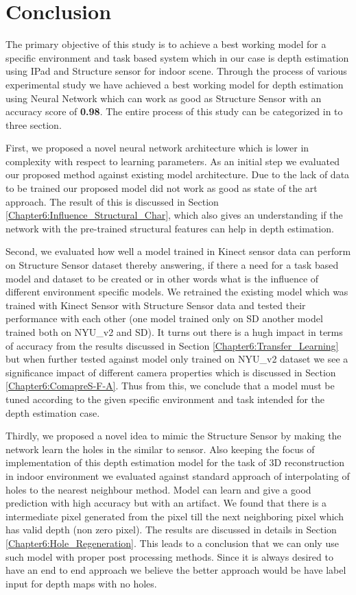 

\chapter{Conclusion}
\label{Chaptee7:Concluion}
The primary objective of this study is to achieve a best working model for a specific environment and task based system which in our case is depth estimation using IPad and Structure sensor for indoor scene. Through the process of various experimental study we have achieved a best working model for depth estimation using Neural Network which can work as good as Structure Sensor with an accuracy score of \textbf{0.98}. The entire process of this study can be categorized in to three section.

First, we proposed a novel neural network architecture which is lower in complexity with respect to learning parameters. As an initial step we evaluated our proposed method against existing model architecture. Due to the lack of data to be trained our proposed model did not work as good as state of the art approach. The result of this is discussed in Section \ref{Chapter6:Influence_Structural_Char}, which also gives an understanding if the network with the pre-trained structural features can help in depth estimation. 

Second, we evaluated how well a model trained in Kinect sensor data can perform on Structure Sensor dataset thereby answering, if there a need for a task based model and dataset to be created or in other words what is the influence of different environment specific models. We retrained the existing model which was trained with Kinect Sensor with Structure Sensor data and tested their performance with each other (one model trained only on SD another model trained both on NYU\_v2 and SD). It turns out there is a hugh impact in terms of accuracy from the results discussed in Section \ref{Chapter6:Transfer_Learning} but when further tested against model only trained on NYU\_v2 dataset we see a significance impact of different camera properties which is discussed in Section \ref{Chapter6:ComapreS-F-A}. Thus from this, we conclude that a model must be tuned according to the given specific environment and task intended for the depth estimation case.

Thirdly, we proposed a novel idea to mimic the Structure Sensor by making the network learn the holes in the similar to sensor. Also keeping the focus of implementation of this depth estimation model for the task of 3D reconstruction in indoor environment we evaluated against standard approach of interpolating of holes to the nearest neighbour method. Model can learn and give a good prediction with high accuracy but with an artifact. We found that there is a intermediate pixel generated from the pixel till the next neighboring pixel which has valid depth (non zero pixel). The results are discussed in details in Section \ref{Chapter6:Hole_Regeneration}. This leads to a conclusion that we can only use such model with proper post processing methods. Since it is always desired to have an end to end approach we believe the better approach would be have label input for depth maps with no holes. 


